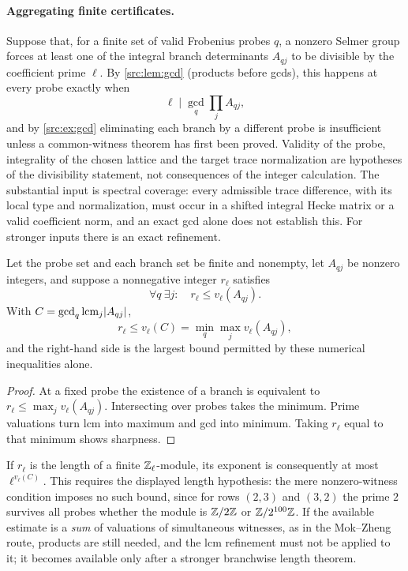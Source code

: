 \paragraph{Aggregating finite certificates.}
Suppose that, for a finite set of valid Frobenius probes $q$, a nonzero
Selmer group forces at least one of the integral branch determinants
$A_{qj}$ to be divisible by the coefficient prime $\ell$. By
\cref{src:lem:gcd} (products before gcds), this happens at every probe exactly
when
\begin{equation}\label{sel:eq:productgcd}
 \ell\mid\gcd_q\prod_jA_{qj},
\end{equation}
and by \cref{src:ex:gcd}
 eliminating each branch by a different probe is
insufficient unless a common-witness theorem has first been proved.
Validity of the probe, integrality of the chosen lattice and the target
trace normalization are hypotheses of the divisibility statement, not
consequences of the integer calculation. The substantial input is spectral
coverage: every admissible trace difference, with its local type and
normalization, must occur in a shifted integral Hecke matrix or a valid
coefficient norm, and an exact gcd alone does not establish this. For
stronger inputs there is an exact refinement.

\begin{proposition}\label{sel:prop:lcm}
Let the probe set and each branch set be finite and nonempty, let $A_{qj}$
be nonzero integers, and suppose a nonnegative integer $r_\ell$ satisfies
\[
 \forall q\ \exists j:\quad r_\ell\le v_\ell(A_{qj}).
\]
With $C=\gcd_q\operatorname{lcm}_j\lvert A_{qj}\rvert$,
\[
 r_\ell\le v_\ell(C)=\min_q\max_jv_\ell(A_{qj}),
\]
and the right-hand side is the largest bound permitted by these numerical
inequalities alone.
\end{proposition}

\begin{proof}
At a fixed probe the existence of a branch is equivalent to
$r_\ell\le\max_jv_\ell(A_{qj})$. Intersecting over probes takes the
minimum. Prime valuations turn lcm into maximum and gcd into minimum.
Taking $r_\ell$ equal to that minimum shows sharpness.
\end{proof}

If $r_\ell$ is the length of a finite $\mathbb{Z}_\ell$-module, its exponent is
consequently at most $\ell^{v_\ell(C)}$. This requires the displayed length
hypothesis: the mere nonzero-witness condition imposes no such bound, since
for rows $(2,3)$ and $(3,2)$ the prime $2$ survives all probes whether the
module is $\mathbb{Z}/2\mathbb{Z}$ or $\mathbb{Z}/2^{100}\mathbb{Z}$. If the available estimate is a
\emph{sum} of valuations of simultaneous witnesses, as in the Mok--Zheng
route, products are still needed, and the lcm refinement must not be
applied to it; it becomes available only after a stronger branchwise length
theorem.

